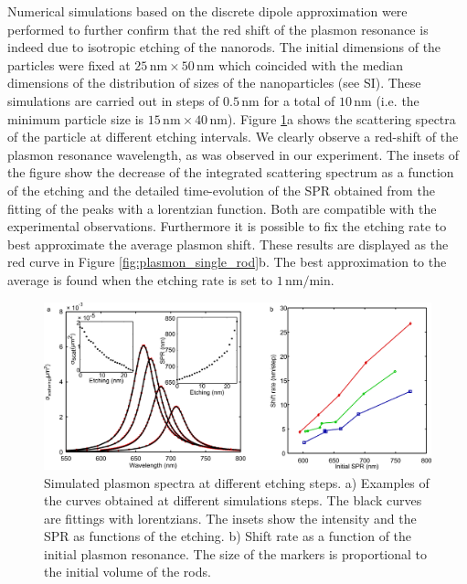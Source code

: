 \documentclass[a4paper,oneside,onecolumn]{article}
\newcommand{\nm}{\ensuremath{\,\textrm{nm}}}
\begin{document}
Numerical simulations based on the discrete dipole approximation were
performed to further confirm that the red shift of the plasmon resonance is
indeed due to isotropic etching of the nanorods. The initial dimensions of the
particles were fixed at $25\nm\times50\nm$ which coincided with the median
dimensions of the distribution of sizes of the nanoparticles (see SI). These
simulations are carried out in steps of $0.5\nm$ for a total of $10\nm$ (i.e.
the minimum particle size is $15\nm\times 40 \nm$). Figure
\ref{fig:simulations}a shows the scattering spectra of the particle at
different etching intervals. We clearly observe a red-shift of the plasmon
resonance wavelength, as was observed in our experiment. The insets of the
figure show the decrease of the integrated scattering spectrum as a function of
the etching and the detailed time-evolution of the SPR obtained from the fitting
of the peaks with a lorentzian function. Both are compatible with the
experimental observations. Furthermore it is possible to fix the etching rate to
best approximate the average plasmon shift. These results are displayed as the
red curve in Figure \ref{fig:plasmon_single_rod}b. The best approximation to
the average is found when the etching rate is set to $1\nm/\textrm{min}$. 

\begin{figure}[p]
 \centering
 \includegraphics[width=0.95\linewidth]{Figures/02_Simulations/simulations.png}
 \caption{Simulated plasmon spectra at different etching steps. a) Examples of
 the curves obtained at different simulations steps. The black curves are
 fittings with lorentzians. The insets show the intensity and the SPR as
 functions of the etching. b) Shift rate as a function of the initial
 plasmon resonance. The size of the markers is proportional to the initial
 volume of the rods.}
 \label{fig:simulations}
\end{figure}
\end{document}
